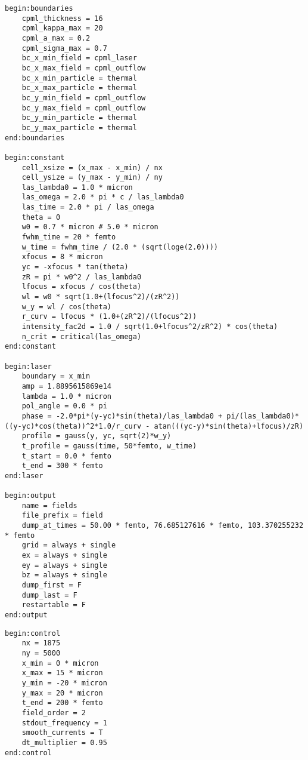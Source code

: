 \begin{multicols}{2}
\begin{lstlisting}[style=CXX, caption={Input file for identifying the conditions for which the propagation of the laser beam under the paraxial approximation is valid (chapter 4).}]
begin:boundaries
	cpml_thickness = 16
	cpml_kappa_max = 20
	cpml_a_max = 0.2
	cpml_sigma_max = 0.7
	bc_x_min_field = cpml_laser
	bc_x_max_field = cpml_outflow
	bc_x_min_particle = thermal
	bc_x_max_particle = thermal
	bc_y_min_field = cpml_outflow
	bc_y_max_field = cpml_outflow
	bc_y_min_particle = thermal
	bc_y_max_particle = thermal
end:boundaries

begin:constant
	cell_xsize = (x_max - x_min) / nx
	cell_ysize = (y_max - y_min) / ny
	las_lambda0 = 1.0 * micron                            
	las_omega = 2.0 * pi * c / las_lambda0                    
	las_time = 2.0 * pi / las_omega                          
	theta = 0                                                                              
	w0 = 0.7 * micron # 5.0 * micron                                     
	fwhm_time = 20 * femto                                         
	w_time = fwhm_time / (2.0 * (sqrt(loge(2.0))))
	xfocus = 8 * micron                                         
	yc = -xfocus * tan(theta)                                      
	zR = pi * w0^2 / las_lambda0                                  
	lfocus = xfocus / cos(theta)                                   
	wl = w0 * sqrt(1.0+(lfocus^2)/(zR^2))                        
	w_y = wl / cos(theta)                                         
	r_curv = lfocus * (1.0+(zR^2)/(lfocus^2))                
	intensity_fac2d = 1.0 / sqrt(1.0+lfocus^2/zR^2) * cos(theta)   
	n_crit = critical(las_omega)                                   
end:constant

begin:laser
	boundary = x_min
	amp = 1.8895615869e14
	lambda = 1.0 * micron
	pol_angle = 0.0 * pi
	phase = -2.0*pi*(y-yc)*sin(theta)/las_lambda0 + pi/(las_lambda0)*((y-yc)*cos(theta))^2*1.0/r_curv - atan(((yc-y)*sin(theta)+lfocus)/zR)
	profile = gauss(y, yc, sqrt(2)*w_y)
	t_profile = gauss(time, 50*femto, w_time)
	t_start = 0.0 * femto
	t_end = 300 * femto
end:laser

begin:output
	name = fields
	file_prefix = field
	dump_at_times = 50.00 * femto, 76.685127616 * femto, 103.370255232 * femto
	grid = always + single
	ex = always + single
	ey = always + single
	bz = always + single
	dump_first = F
	dump_last = F
	restartable = F
end:output
\end{lstlisting}

\begin{lstlisting}[style=CXX, caption={Input file for the large-scale simulations of tightly focused laser beams interacting with solid targets (chapter 5).}]
begin:control
	nx = 1875
	ny = 5000
	x_min = 0 * micron
	x_max = 15 * micron
	y_min = -20 * micron
	y_max = 20 * micron
	t_end = 200 * femto
	field_order = 2
	stdout_frequency = 1
	smooth_currents = T
	dt_multiplier = 0.95
end:control


\end{lstlisting}
\end{multicols}
